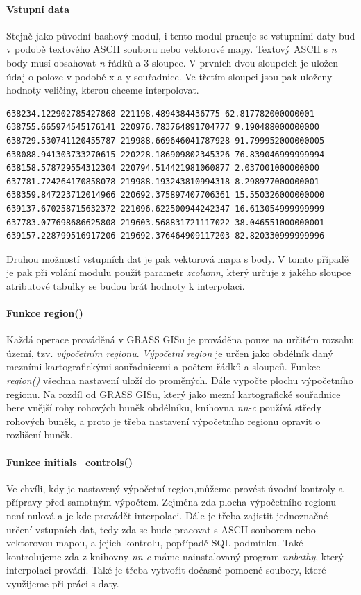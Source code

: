 \documentclass[12pt,a4paper]{article}
\begin{document}
\paragraph{Vstupní data}
Stejně jako původní bashový modul, i tento modul pracuje se vstupními daty buď v podobě textového ASCII souboru nebo vektorové mapy. Textový ASCII s \textit{n} body musí obsahovat \textit{n} řádků a 3 sloupce. V prvních dvou sloupcích je uložen údaj o poloze v podobě x a y souřadnice. Ve třetím sloupci jsou pak uloženy hodnoty veličiny, kterou chceme interpolovat.

\begin{lstlisting}
638234.122902785427868 221198.4894384436775 62.817782000000001
638755.665974545176141 220976.783764891704777 9.190488000000000
638729.530741120455787 219988.669646041787928 91.799952000000005
638088.941303733270615 220228.186909802345326 76.839046999999994
638158.578729554312304 220794.514421981060877 2.037001000000000
637781.724264170858078 219988.193243810994318 8.298977000000001
638359.847223712014966 220692.375897407706361 15.550326000000000
639137.670258715632372 221096.622500944242347 16.613054999999999
637783.077698686625808 219603.568831721117022 38.046551000000001
639157.228799516917206 219692.376464909117203 82.820330999999996
\end{lstlisting}

Druhou možností vstupních dat je pak vektorová mapa s body. V tomto případě je pak při volání modulu použít parametr \textit{zcolumn}, který určuje z jakého sloupce atributové tabulky se budou brát hodnoty k interpolaci.


\paragraph{Funkce region()}
Každá operace prováděná v GRASS GISu je prováděna pouze na určitém rozsahu území, tzv. \textit{výpočetním regionu}. \textit{Výpočetní region} je určen jako obdélník daný mezními kartografickými souřadnicemi a počtem řádků a sloupců. 
Funkce \textit{region()} všechna nastavení uloží do proměných. Dále vypočte plochu výpočetního regionu. Na rozdíl od GRASS GISu, který jako mezní kartografické souřadnice bere vnější rohy rohových buněk obdélníku, knihovna \textit{nn-c} používá středy rohových buněk, a proto je třeba nastavení výpočetního regionu opravit o rozlišení buněk.


\paragraph{Funkce initials\_controls()}
Ve chvíli, kdy je nastavený výpočetní region,můžeme provést úvodní kontroly a přípravy před samotným výpočtem. Zejména zda plocha výpočetního regionu není nulová a je kde provádět interpolaci. Dále je třeba zajistit jednoznačné určení vstupních dat, tedy zda se bude pracovat s ASCII souborem nebo vektorovou mapou, a jejich kontrolu, popřípadě SQL podmínku. Také kontrolujeme zda z knihovny \textit{nn-c} máme nainstalovaný program \textit{nnbathy}, který interpolaci provádí. Také je třeba vytvořit dočasné pomocné soubory, které využijeme při práci s daty. 
\end{document}
